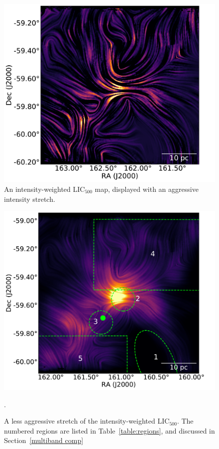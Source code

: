 \begin{figure}[!htbp]
\centering
\includegraphics[width=\textwidth]{figures/carina/lic2_han51}
\caption[An intensity-weighted  map, displayed with an aggressive intensity stretch.]{An intensity-weighted LIC$_{500}$ map, displayed with an aggressive intensity stretch.}
\label{fig:lic2_han51}
\end{figure}

\begin{figure}[!htbp]
\centering
\includegraphics[width=\textwidth]{figures/carina/lic_mult}
\caption[A less aggressive stretch of the intensity-weighted .]{A less aggressive stretch of the intensity-weighted LIC$_{500}$. The numbered regions are listed in Table~\ref{table:regions}, and discussed in Section~\ref{multiband comp}}.
\label{fig:lic_map}
\end{figure}

